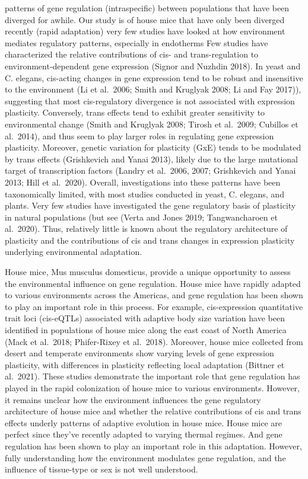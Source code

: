 \documentclass[9pt,twocolumn,twoside,lineno]{pnas-new}
\begin{document}
patterns of gene regulation (intraspecific) between populations that
have been diverged for awhile. Our study is of house mice that have only
been diverged recently (rapid adaptation) very few studies have looked
at how environment mediates regulatory patterns, especially in
endotherms Few studies have characterized the relative contributions of
cis- and trans-regulation to environment-dependent gene expression
(Signor and Nuzhdin 2018). In yeast and C. elegans, cis-acting changes
in gene expression tend to be robust and insensitive to the environment
(Li et al.~2006; Smith and Kruglyak 2008; Li and Fay 2017)), suggesting
that most cis-regulatory divergence is not associated with expression
plasticity. Conversely, trans effects tend to exhibit greater
sensitivity to environmental change (Smith and Kruglyak 2008; Tirosh et
al.~2009; Cubillos et al.~2014), and thus seem to play larger roles in
regulating gene expression plasticity. Moreover, genetic variation for
plasticity (GxE) tends to be modulated by trans effects (Grishkevich and
Yanai 2013), likely due to the large mutational target of transcription
factors (Landry et al.~2006, 2007; Grishkevich and Yanai 2013; Hill et
al.~2020). Overall, investigations into these patterns have been
taxonomically limited, with most studies conducted in yeast, C. elegans,
and plants. Very few studies have investigated the gene regulatory basis
of plasticity in natural populations (but see (Verta and Jones 2019;
Tangwancharoen et al.~2020). Thus, relatively little is known about the
regulatory architecture of plasticity and the contributions of cis and
trans changes in expression plasticity underlying environmental
adaptation.

House mice, Mus musculus domesticus, provide a unique opportunity to
assess the environmental influence on gene regulation. House mice have
rapidly adapted to various environments across the Americas, and gene
regulation has been shown to play an important role in this process. For
example, cis-expression quantitative trait loci (cis-eQTLs) associated
with adaptive body size variation have been identified in populations of
house mice along the east coast of North America (Mack et al.~2018;
Phifer-Rixey et al.~2018). Moreover, house mice collected from desert
and temperate environments show varying levels of gene expression
plasticity, with differences in plasticity reflecting local adaptation
(Bittner et al.~2021). These studies demonstrate the important role that
gene regulation has played in the rapid colonization of house mice to
various environments. However, it remains unclear how the environment
influences the gene regulatory architecture of house mice and whether
the relative contributions of cis and trans effects underly patterns of
adaptive evolution in house mice. House mice are perfect since they've
recently adapted to varying thermal regimes. And gene regulation has
been shown to play an important role in this adaptation. However, fully
understanding how the environment modulates gene regulation, and the
influence of tissue-type or sex is not well understood.
\end{document}
